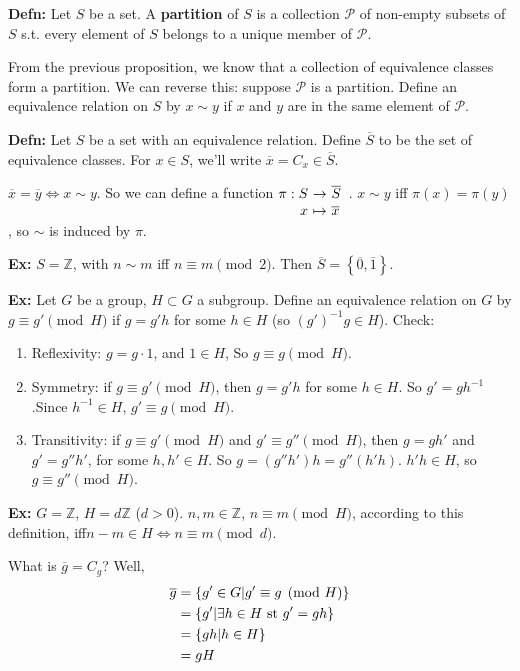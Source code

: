 \documentclass[10pt,letterpaper]{article}
\newcommand{\n}{\hfill\break}
\newcommand{\hangblock}[2]{\par\noindent\settowidth{\hangindent}{\textbf{#1: }}\textbf{#1: }\!\!\!#2}
\newcommand{\defn}[1]{\hangblock{Defn}{#1}}
\newcommand{\ex}[1]{\hangblock{Ex}{#1}}
\newcommand{\ptxt}[1]{\textrm{\textnormal{#1}}}
\newcommand{\set}[1]{\left\{#1\right\}}
\newcommand{\integers}{\mathbb{Z}}
\newcommand{\Z}{\integers}
\newcommand{\inv}{^{-1}}
\newcommand{\map}[4]{\!\!\!\begin{array}[t]{rcl}#1 & \!\!\!\!\to & \!\!\!\!#2\\ #3 & \!\!\!\!\mapsto & \!\!\!\!#4\end{array}}
\newcommand{\st}{s.t.}
\begin{document}
\defn{
	Let $S$ be a set. A \textbf{partition} of $S$ is a collection $\mathcal{P}$ of non-empty subsets of $S$ \st{} every element of $S$ belongs to a unique member of $\mathcal{P}$.\n
}

\par\noindent
From the previous proposition, we know that a collection of equivalence classes form a partition.\n
We can reverse this: suppose $\mathcal{P}$ is a partition. Define an equivalence relation on $S$ by $x\sim{}y$ if $x$ and $y$ are in the same element of $\mathcal{P}$.\n

\defn{
	Let $S$ be a set with an equivalence relation. Define $\overline{S}$ to be the set of equivalence classes. For $x\in{}S$, we'll write $\overline{x}=C_{x}\in\overline{S}$.
}

\par\noindent
$\overline{x}=\overline{y}\Leftrightarrow{}x\sim{}y$.\n
So we can define a function $\map{\pi:S}{\overline{S}}{x}{\overline{x}}$. $x\sim{}y$ iff $\pi(x)=\pi(y)$, so $\sim$ is induced by $\pi$.\n

\ex{
	$S=\Z$, with $n\sim{}m$ iff $n\equiv{}m\pmod{2}$. Then $\overline{S}=\set{\overline{0},\overline{1}}$.\n
}

\ex{
	Let $G$ be a group, $H\subset{}G$ a subgroup. Define an equivalence relation on $G$ by $g\equiv{}g'\pmod{H}$ if $g=g'h$ for some $h\in{}H$ (so $(g')\inv{}g\in{}H$).\n
	Check:
	\begin{enumerate}
		\item Reflexivity: $g=g\cdot{}1$, and $1\in{}H$, So $g\equiv{}g\pmod{H}$.
		\item Symmetry: if $g\equiv{}g'\pmod{H}$, then $g=g'h$ for some $h\in{}H$. So $g'=gh\inv$.\n Since $h\inv\in{}H$, $g'\equiv{}g\pmod{H}$.
		\item Transitivity: if $g\equiv{}g'\pmod{H}$ and $g'\equiv{}g''\pmod{H}$, then $g=gh'$ and $g'=g''h'$, for some $h,h'\in{}H$. So $g=(g''h')h=g''(h'h)$. $h'h\in{}H$, so $g\equiv{}g''\pmod{H}$.
	\end{enumerate}
}

\ex{
	$G=\Z$, $H=d\Z$ ($d>0$). $n,m\in\Z$, $n\equiv{}m\pmod{H}$, according to this definition, iff\n $n-m\in{}H\Leftrightarrow{}n\equiv{}m\pmod{d}$.\n
}

\par\noindent
What is $\overline{g}=C_{g}$? Well,
\begin{align*}
	\overline{g} & =\set{g'\in{}G|g'\equiv{}g\pmod{H}}\\
	& =\set{g'|\exists{}h\in{}H\ptxt{ st{} }g'=gh}\\
	& =\set{gh|h\in{}H}\\
	& =gH
\end{align*}
\end{document}
